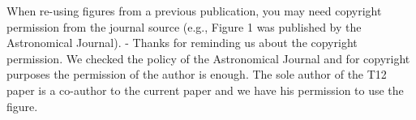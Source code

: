 When re-using figures from a previous publication, you may need copyright permission from the journal source (e.g., Figure 1 was published by the Astronomical Journal).
-	Thanks for reminding us about the copyright permission. We checked the policy of the Astronomical Journal and for copyright purposes the permission of the author is enough. The sole author of the T12 paper is a co-author to the current paper and we have his permission to use the figure.
